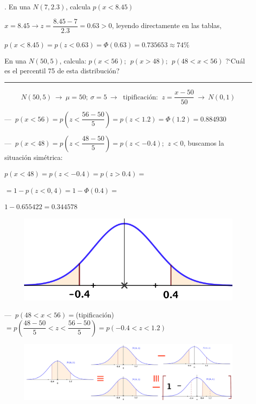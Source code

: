 \vspace{4mm}%
\begin{example}
.	En una $N(7,2.3)$, calcula $p(x<8.45)$

\vspace{2mm} 	$x=8.45 \to z=\dfrac{8.45-7}{2.3}=0.63>0$, leyendo directamente en las tablas, 

$p(x<8.45)=p(z<0.63)=\Phi(0.63)=0.735653\approx 74\%$
\end{example}

\vspace{4mm}%
\begin{ejemplo}
\begin{ejre}
	En una $N(50,5)$, calcula: $p(x<56);\ \ p(x>48);\ \ p(48<x<56)$ ?`Cuál es el percentil 75 de esta distribución? 
	
\rule{250pt}{0.1pt}

$$N(50,5) \ \to \ \mu=50;\ \sigma = 5 \ \longrightarrow \ \text{ tipificación: }\ z=\dfrac{x-50}{50} \ \to \ N(0,1)$$

--- $\ p(x<56)=p\left( z<\dfrac{56-50}{5} \right) = p(z<1.2)=\Phi(1.2)=0.884930$

--- $\ p(x<48)= p\left( z<\dfrac{48-50}{5} \right) = p(z<-0.4) $; $\ z<0$, buscamos la situación simétrica:

\begin{multicols}{2}
	
	$p(x<48)=p(z<-0.4)=p(z>0.4)=$
	
	$=1-p(z<0,4)=1-\Phi(0.4)=$
	
	$1-0.655422=0.344578$
	
	\begin{figure}[H]
	\centering
	\includegraphics[width=.4\textwidth]{imagenes/imagenes04/T04IM30.png}
	\end{figure}
	
\end{multicols}

--- $\  p(48<x<56)=$\textcolor{gris}{(tipificación)}$=p \left( \dfrac{48-50}{5} <z< \dfrac{56-50}{5} \right) = p(-0.4<z<1.2)$

	\begin{figure}[H]
	\centering
	\includegraphics[width=1\textwidth]{imagenes/imagenes04/T04IM34.png}
	\end{figure}
	

\end{ejre}
\end{ejemplo}
